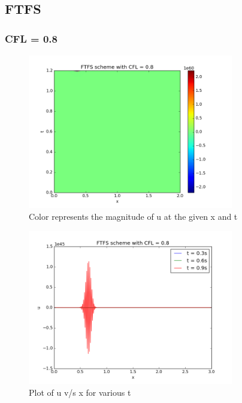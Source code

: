 \documentclass[11pt, a4paper]{article}
\begin{document}
\subsection{FTFS}
\subsubsection{CFL = 0.8}
\begin{figure}[H]
 \centering
 \includegraphics[width = 0.8\textwidth]{FTFS3_08.png}
 \caption{Color represents the magnitude of u at the given x and t}
\end{figure}

\begin{figure}[H]
 \centering
 \includegraphics[width = 0.8\textwidth]{FTFS3_08_1.png}
 \caption{Plot of u v/s x for various t}
\end{figure}
\end{document}
